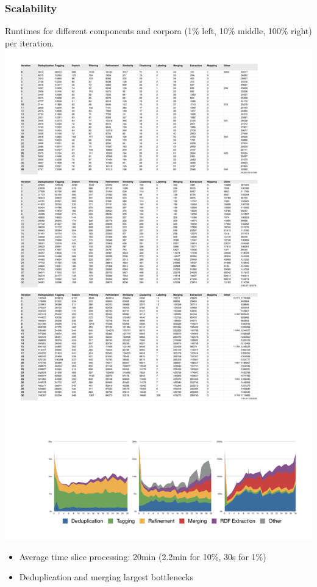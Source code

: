 \documentclass{beamer}
\begin{document}

\begin{frame}
    \frametitle{Scalability}
    \begin{block}{Runtimes for different components and corpora (1\% left, 10\% middle, 100\% right) per iteration.}
        \includegraphics[width=\textwidth]{../images/speed.pdf}
    \end{block}
    \begin{itemize}
        \item Average time slice processing: 20min (2.2min for 10\%, 30s for 1\%) 
        \item Deduplication and merging largest bottlenecks
    \end{itemize}
\end{frame}
\end{document}
